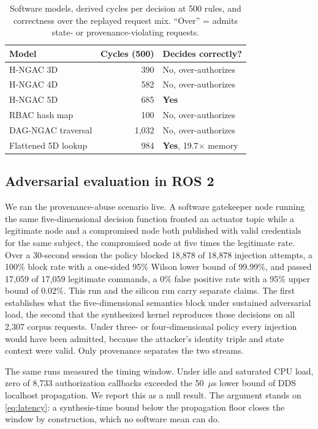 \documentclass[conference]{IEEEtran}
\begin{document}
\begin{table}[t]
\caption{Software models, derived cycles per decision at 500 rules, and correctness over the replayed request mix. ``Over'' = admits state- or provenance-violating requests.}
\label{tab:models}
\centering
\begin{tabular}{lrl}
\toprule
Model & Cycles (500) & Decides correctly? \\
\midrule
H-NGAC 3D & 390 & No, over-authorizes \\
H-NGAC 4D & 582 & No, over-authorizes \\
H-NGAC 5D & 685 & \textbf{Yes} \\
RBAC hash map & 100 & No, over-authorizes \\
DAG-NGAC traversal & 1{,}032 & No, over-authorizes \\
Flattened 5D lookup & 984 & \textbf{Yes}, 19.7$\times$ memory \\
\bottomrule
\end{tabular}
\end{table}

\subsection{Adversarial evaluation in ROS 2}

We ran the provenance-abuse scenario live. A software gatekeeper node running the same five-dimensional decision function fronted an actuator topic while a legitimate node and a compromised node both published with valid credentials for the same subject, the compromised node at five times the legitimate rate. Over a 30-second session the policy blocked 18{,}878 of 18{,}878 injection attempts, a 100\% block rate with a one-sided 95\% Wilson lower bound of 99.99\%, and passed 17{,}059 of 17{,}059 legitimate commands, a 0\% false positive rate with a 95\% upper bound of 0.02\%. This run and the silicon run carry separate claims. The first establishes what the five-dimensional semantics block under sustained adversarial load, the second that the synthesized kernel reproduces those decisions on all 2{,}307 corpus requests. Under three- or four-dimensional policy every injection would have been admitted, because the attacker's identity triple and state context were valid. Only provenance separates the two streams.

The same runs measured the timing window. Under idle and saturated CPU load, zero of 8{,}733 authorization callbacks exceeded the 50~$\mu$s lower bound of DDS localhost propagation. We report this as a null result. The argument stands on \eqref{eq:latency}: a synthesis-time bound below the propagation floor closes the window by construction, which no software mean can do.
\end{document}
